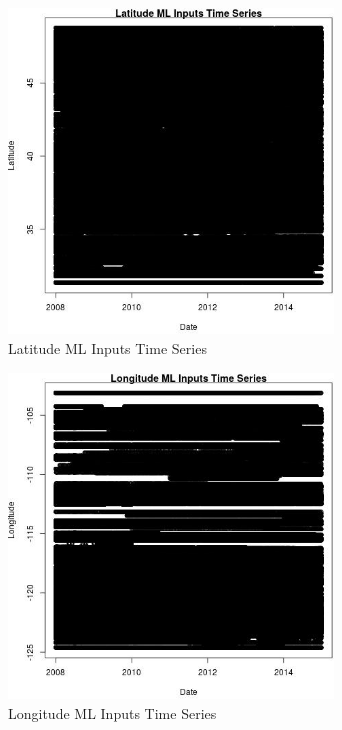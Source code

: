 \begin{figure} 
\centering  
\includegraphics[width=0.77\textwidth]{Code_Outputs/ML_input_report_ML_input_PM25_Step5_part_d_de_duplicated_aves_ML_input_LatitudevDate.jpg} 
\caption{\label{fig:ML_input_report_ML_input_PM25_Step5_part_d_de_duplicated_aves_ML_inputLatitudevDate}Latitude ML Inputs Time Series} 
\end{figure} 
 

\begin{figure} 
\centering  
\includegraphics[width=0.77\textwidth]{Code_Outputs/ML_input_report_ML_input_PM25_Step5_part_d_de_duplicated_aves_ML_input_LongitudevDate.jpg} 
\caption{\label{fig:ML_input_report_ML_input_PM25_Step5_part_d_de_duplicated_aves_ML_inputLongitudevDate}Longitude ML Inputs Time Series} 
\end{figure} 
 

